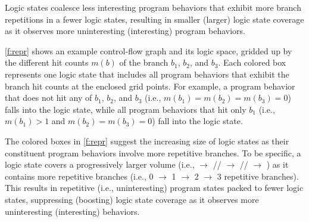 \documentclass[letterpaper,twocolumn,10pt]{article}
\begin{document}
Logic states coalesce less interesting program behaviors that exhibit more
branch repetitions in a fewer logic states, resulting in smaller (larger) logic
state coverage as it observes more uninteresting (interesting) program
behaviors.


\autoref{f:repr} shows an example control-flow graph and its logic space,
gridded up by the different hit counts $m(b)$ of the branch $b_1$, $b_2$, and $b_3$.
Each colored box represents one logic state that includes all program
behaviors that exhibit the branch hit counts at the enclosed grid points.
For example, a program behavior that does not hit any of $b_1$, $b_2$, and $b_3$ 
(i.e., $m(b_1)=m(b_2)=m(b_3)=0$) falls into the  logic state, while
all program behaviors that hit only $b_1$ (i.e., $m(b_1)>1$ and
$m(b_2)=m(b_3)=0$) fall into the  logic state.

The colored boxes in \autoref{f:repr} suggest the increasing size of logic
states as their constituent program behaviors involve more repetitive branches.
To be specific, a logic state covers a progressively larger volume 
(i.e.,  $\rightarrow$ //
$\rightarrow$ // $\rightarrow$
) as it contains more repetitive branches (i.e., 0 $\rightarrow$ 1
$\rightarrow$ 2 $\rightarrow$ 3 repetitive branches). 
%
This results in repetitive (i.e., uninteresting) program states packed
to fewer logic states, suppressing (boosting) logic state coverage as it observes more
uninteresting (interesting) behaviors.

\end{document}
